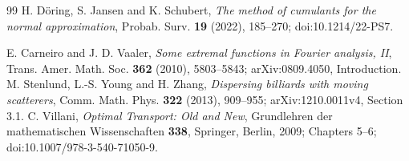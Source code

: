 \begin{thebibliography}{99}
 H. D\"oring, S. Jansen and K. Schubert,
\emph{The method of cumulants for the normal approximation},
Probab. Surv. \textbf{19} (2022), 185--270; doi:10.1214/22-PS7.

 E. Carneiro and J. D. Vaaler,
\emph{Some extremal functions in Fourier analysis, II},
Trans. Amer. Math. Soc. \textbf{362} (2010), 5803--5843;
arXiv:0809.4050, Introduction.
 M. Stenlund, L.-S. Young and H. Zhang,
\emph{Dispersing billiards with moving scatterers},
Comm. Math. Phys. \textbf{322} (2013), 909--955;
arXiv:1210.0011v4, Section 3.1.
 C. Villani, \emph{Optimal Transport: Old and New},
Grundlehren der mathematischen Wissenschaften \textbf{338}, Springer,
Berlin, 2009; Chapters 5--6; doi:10.1007/978-3-540-71050-9.
\end{thebibliography}

